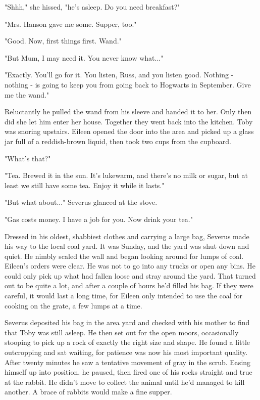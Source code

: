 \documentclass[a4paper,11pt]{article}
\begin{document}
"Shhh," she hissed, "he's asleep. Do you need breakfast?"

"Mrs. Hanson gave me some. Supper, too."

"Good. Now, first things first. Wand."

"But Mum, I may need it. You never know what..."

"Exactly. You'll go for it. You listen, Russ, and you listen good. Nothing - nothing - is going to keep you from going back to Hogwarts in September. Give me the wand."

Reluctantly he pulled the wand from his sleeve and handed it to her. Only then did she let him enter her house. Together they went back into the kitchen. Toby was snoring upstairs. Eileen opened the door into the area and picked up a glass jar full of a reddish-brown liquid, then took two cups from the cupboard.

"What's that?"

"Tea. Brewed it in the sun. It's lukewarm, and there's no milk or sugar, but at least we still have some tea. Enjoy it while it lasts."

"But what about..." Severus glanced at the stove.

"Gas costs money. I have a job for you. Now drink your tea."

Dressed in his oldest, shabbiest clothes and carrying a large bag, Severus made his way to the local coal yard. It was Sunday, and the yard was shut down and quiet. He nimbly scaled the wall and began looking around for lumps of coal. Eileen's orders were clear. He was not to go into any trucks or open any bins. He could only pick up what had fallen loose and stray around the yard. That turned out to be quite a lot, and after a couple of hours he'd filled his bag. If they were careful, it would last a long time, for Eileen only intended to use the coal for cooking on the grate, a few lumps at a time.

Severus deposited his bag in the area yard and checked with his mother to find that Toby was still asleep. He then set out for the open moors, occasionally stooping to pick up a rock of exactly the right size and shape. He found a little outcropping and sat waiting, for patience was now his most important quality. After twenty minutes he saw a tentative movement of gray in the scrub. Easing himself up into position, he paused, then fired one of his rocks straight and true at the rabbit. He didn't move to collect the animal until he'd managed to kill another. A brace of rabbits would make a fine supper.
\end{document}
